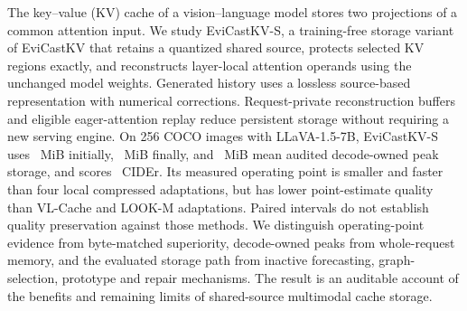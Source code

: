 The key--value (KV) cache of a vision--language model stores two projections
of a common attention input. We study EviCastKV-S, a training-free storage
variant of EviCastKV that retains a quantized shared source, protects selected
KV regions exactly, and reconstructs layer-local attention operands using
the unchanged model weights. Generated history uses a lossless source-based
representation with numerical corrections. Request-private reconstruction
buffers and eligible eager-attention replay reduce persistent storage without
requiring a new serving engine. On 256 COCO images with LLaVA-1.5-7B,
EviCastKV-S uses \EviInitial~MiB initially, \EviFinal~MiB finally, and
\EviPeak~MiB mean audited decode-owned peak storage, and scores
\EviCider~CIDEr. Its measured operating point is smaller and faster than
four local compressed adaptations, but has lower point-estimate quality than
VL-Cache and LOOK-M adaptations. Paired intervals do not establish quality
preservation against those methods. We distinguish operating-point evidence
from byte-matched superiority, decode-owned peaks from whole-request memory,
and the evaluated storage path from inactive forecasting, graph-selection,
prototype and repair mechanisms. The result is an auditable account of the
benefits and remaining limits of shared-source multimodal cache storage.
